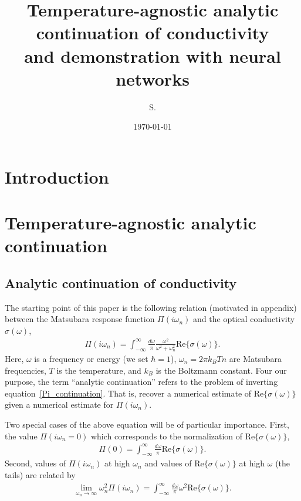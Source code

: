 \documentclass[notitlepage, 11pt, nofootinbib]{revtex4-1}
\begin{document}
\title{\bf Temperature-agnostic analytic continuation of conductivity\\and demonstration with neural networks}
\author{S. }
\date{\today}

\begin{abstract}

\end{abstract}

\maketitle
\vspace{-.5cm}
\tableofcontents



\section{Introduction}


\section{Temperature-agnostic analytic continuation}

\subsection{Analytic continuation of conductivity}

The starting point of this paper is the following relation (motivated in appendix) between the Matsubara response function $\Pi(i\omega_n)$ and the optical conductivity $\sigma(\omega)$,
\begin{align}
\Pi(i\omega_n) 
=
\int_{-\infty}^{\infty} \frac{d\omega}{\pi} \frac{\omega^2}{\omega^2+\omega_n^2}
\text{Re}\{ \sigma(\omega) \}.
\label{Pi_continuation}
\end{align}
Here, $\omega$ is a frequency or energy (we set $\hbar=1$), $\omega_n=2\pi k_BTn$ are Matsubara frequencies, $T$ is the temperature, and $k_B$ is the Boltzmann constant.
Four our purpose, the term ``analytic continuation'' refers to the problem of inverting equation~\eqref{Pi_continuation}. That is, recover a numerical estimate of $\text{Re}\{ \sigma(\omega) \}$ given a numerical estimate for $\Pi(i\omega_n)$.

Two special cases of the above equation will be of particular importance. First, the value $\Pi(i\omega_n=0)$ which corresponds to the normalization of $\text{Re}\{ \sigma(\omega) \}$,
\begin{align}
\Pi(0) 
=
\int_{-\infty}^{\infty} \frac{d\omega}{\pi}
\text{Re}\{ \sigma(\omega) \}.
\label{Pi_normalization}
\end{align}
Second, values of $\Pi(i\omega_n)$ at high $\omega_n$ and values of $\text{Re}\{ \sigma(\omega) \}$ at high $\omega$ (the tails) are related by
\begin{align}
\lim_{\omega_n\rightarrow\infty}
\omega_n^2
\Pi(i\omega_n)
=
\int_{-\infty}^{\infty} \frac{d\omega}{\pi}\omega^2 
\text{Re}\{ \sigma(\omega) \}.
\label{Pi_moment}
\end{align}
\end{document}
